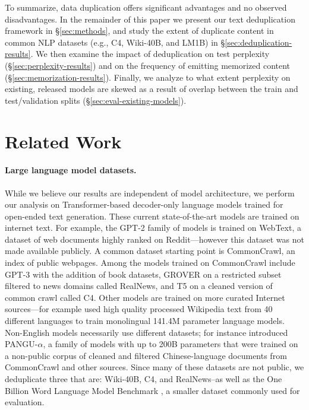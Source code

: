 To summarize, data duplication offers significant advantages and no observed disadvantages.
In the remainder of this paper we present our text deduplication framework in \S\ref{sec:methods}, and study the extent of duplicate content in common NLP datasets (e.g., C4, Wiki-40B, and LM1B) in \S\ref{sec:deduplication-results}.
We then examine the impact of deduplication on test perplexity (\S\ref{sec:perplexity-results}) and on the frequency of emitting memorized content (\S\ref{sec:memorization-results}).
Finally, we analyze to what extent perplexity on existing, released models are skewed as a result of overlap between the train and test/validation splits (\S\ref{sec:eval-existing-models}).

\section{Related Work}
\paragraph{Large language model datasets.}
While we believe our results are independent of model architecture,
we perform our analysis on Transformer-based decoder-only language models \citep{vaswani2017attention} trained for open-ended text generation.
These current state-of-the-art models are trained on internet text.
For example, the GPT-2 family of models \citet{radford2019language} is trained on WebText, a dataset of web documents highly ranked on Reddit---however this dataset was not made available publicly.
A common dataset starting point is CommonCrawl, an index of public webpages.
Among the models trained on CommonCrawl include
GPT-3 \cite{brown2020language} with the addition of book datasets,
GROVER \cite{zellers2019defending} on a restricted subset filtered to news domains called RealNews,
and T5 \cite{raffel2019exploring} on a cleaned version of common crawl called C4.
Other models are trained on more curated Internet sources---for example \citet{guo2020wiki40b} used high quality processed Wikipedia text from 40 different languages to train monolingual 141.4M parameter language models.
Non-English models necessarily use different datasets; \citet{zeng2021pangualpha} for instance introduced PANGU-$\alpha$, a family of models with up to 200B parameters that were trained on a non-public corpus of cleaned and filtered Chinese-language documents from CommonCrawl and other sources.
Since many of these datasets are not public,
we deduplicate three that are: Wiki-40B, C4, and RealNews--as well as the One Billion Word Language Model Benchmark \citep{chelba2013one}, 
a smaller
dataset commonly used for evaluation.

